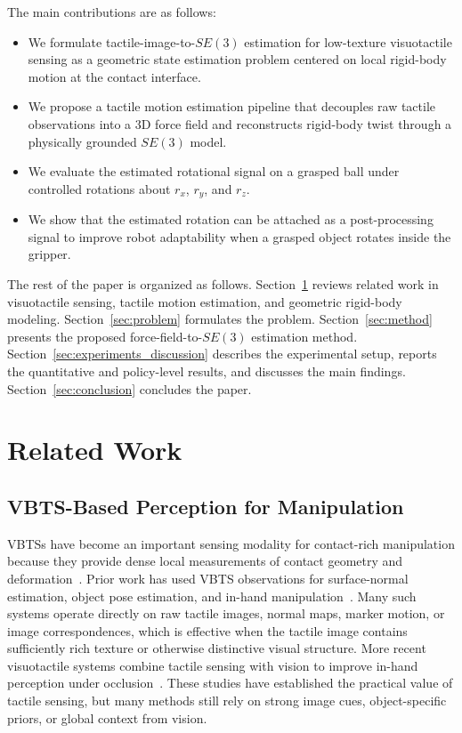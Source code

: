 \documentclass[letterpaper,10pt,journal,twoside]{IEEEtran}
\begin{document}
The main contributions are as follows:
\begin{itemize}
    \item We formulate tactile-image-to-$SE(3)$ estimation for low-texture visuotactile sensing as a geometric state estimation problem centered on local rigid-body motion at the contact interface.
    \item We propose a tactile motion estimation pipeline that decouples raw tactile observations into a 3D force field and reconstructs rigid-body twist through a physically grounded $SE(3)$ model.
    \item We evaluate the estimated rotational signal on a grasped ball under controlled rotations about $r_x$, $r_y$, and $r_z$.
    \item We show that the estimated rotation can be attached as a post-processing signal to improve robot adaptability when a grasped object rotates inside the gripper.
\end{itemize}

The rest of the paper is organized as follows. Section~\ref{sec:related} reviews related work in visuotactile sensing, tactile motion estimation, and geometric rigid-body modeling. Section~\ref{sec:problem} formulates the problem. Section~\ref{sec:method} presents the proposed force-field-to-$SE(3)$ estimation method. Section~\ref{sec:experiments_discussion} describes the experimental setup, reports the quantitative and policy-level results, and discusses the main findings. Section~\ref{sec:conclusion} concludes the paper.

\section{Related Work}
\label{sec:related}

\subsection{VBTS-Based Perception for Manipulation}
VBTSs have become an important sensing modality for contact-rich manipulation because they provide dense local measurements of contact geometry and deformation~\cite{yuan17,lambeta20}. Prior work has used VBTS observations for surface-normal estimation, object pose estimation, and in-hand manipulation~\cite{li2018end,bauza23,huang24}. Many such systems operate directly on raw tactile images, normal maps, marker motion, or image correspondences, which is effective when the tactile image contains sufficiently rich texture or otherwise distinctive visual structure. More recent visuotactile systems combine tactile sensing with vision to improve in-hand perception under occlusion~\cite{dikhale2022visuotactile,suresh24,li25}. These studies have established the practical value of tactile sensing, but many methods still rely on strong image cues, object-specific priors, or global context from vision.
\end{document}
